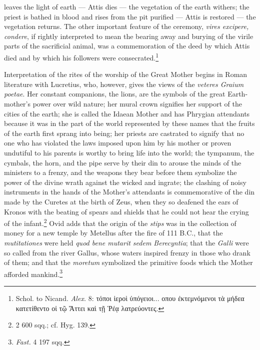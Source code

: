 \documentclass[a4paper, 11pt, oneside, polutonikogreek, english]{article}
\begin{document}
leaves the light of earth --- Attis dies --- the vegetation of the earth withers; the priest is bathed in blood and rises from the pit purified --- Attis is restored --- the vegetation returns. The other important feature of the ceremony, \emph{vires excipere, condere}, if rightly interpreted to mean the bearing away and burying of the virile parts of the sacrificial animal, was a commemoration of the deed by which Attis died and by which his followers were consecrated.\footnote{Schol. to Nicand. \emph{Alex.} 8: τόποι ἱεροὶ ὑπόγειοι... οπου ἐκτεμνόμενοι τὰ μήδεα κατετίθεντο οἱ τῷ Ἄττει καὶ τῇ Ῥέᾳ λατρεύοντες.}

Interpretation of the rites of the worship of the Great Mother begins in Roman literature with Lucretius, who, however, gives the views of the \emph{veteres Graium poetae}. Her constant companions, the lions, are the symbols of the great Earth-mother's power over wild nature; her mural crown signifies her support of the cities of the earth; she is called the Idaean Mother and has Phrygian attendants because it was in the part of the world represented by these names that the fruits of the earth first sprang into being; her priests are castrated to signify that no one who has violated the laws imposed upon him by his mother or proven undutiful to his parents is worthy to bring life into the world; the tympanum, the cymbals, the horn, and the pipe serve by their din to arouse the minds of the ministers to a frenzy, and the weapons they bear before them symbolize the power of the divine wrath against the wicked and ingrate; the clashing of noisy instruments in the hands of the Mother's attendants is commemorative of the din made by the Curetes at the birth of Zeus, when they so deafened the ears of Kronos with the beating of spears and shields that he could not hear the crying of the infant.\footnote{2 600 sqq.; cf. Hyg. 139.} Ovid adds that the origin of the \emph{stips} was in the collection of money for a new temple by Metellus after the fire of 111 \textsc{B.C.}, that the \emph{mutitationes} were held \emph{quod bene mutarit sedem Berecyntia}; that the \emph{Galli} were so called from the river Gallus, whose waters inspired frenzy in those who drank of them; and that the \emph{moretum} symbolized the primitive foods which the Mother afforded mankind.\footnote{\emph{Fast.} 4 197 sqq.}
\end{document}
